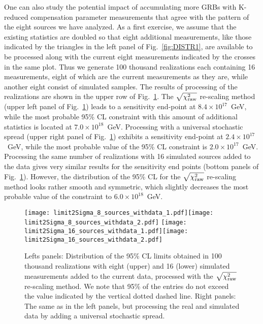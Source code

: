 \documentclass[12pt]{article}
\begin{document}
{One can also study the potential impact of accumulating more GRBs with
K-reduced compensation parameter measurements that agree
with the pattern of the eight sources we have analyzed. As a first exercise, we assume that the
existing statistics are doubled so that  eight additional measurements, like
those indicated by the triangles in the left panel of Fig.~\ref{fig:DISTR1}, are available to
be processed along with the current eight measurements indicated
by the crosses in the same plot. Thus we generate 100 thousand realizations each containing 16 measurements,
eight of which are the current measurements as they are, while another eight consist of simulated samples.
The results of processing of the realizations are shown in
the upper row of Fig.~\ref{fig:limitsDISTR3}. The $\sqrt{\chi_{\rm raw}^2}$ re-scaling method (upper left panel of  Fig.~\ref{fig:limitsDISTR3})
leads to a sensitivity end-point at  $8.4\times 10^{17}$~GeV,
while the most probable 95\% CL constraint with this amount of additional statistics is located at $7.0\times 10^{18}$~GeV.
Processing with a universal stochastic spread (upper right panel of  Fig.~\ref{fig:limitsDISTR3}) exhibits a sensitivity end-point
at $2.4\times 10^{17}$~GeV, while the most probable value of the 95\% CL constraint is $2.0\times 10^{17}$~GeV.
Processing the same number of realizations with 16 simulated sources added to the data gives very similar results for the sensitivity
end points (bottom panels of  Fig.~\ref{fig:limitsDISTR3}). However, the distribution of the 95\% CL for the $\sqrt{\chi_{\rm raw}^2}$ re-scaling method
looks rather smooth and symmetric, which slightly decreases the most probable value of the constraint to  $6.0\times 10^{18}$~GeV.

\begin{figure}
\centering
\texttt{[image: limit2Sigma\_8\_sources\_withdata\_1.pdf]}\hspace{0cm}\texttt{[image: limit2Sigma\_8\_sources\_withdata\_2.pdf]}
\texttt{[image: limit2Sigma\_16\_sources\_withdata\_1.pdf]}\hspace{0cm}\texttt{[image: limit2Sigma\_16\_sources\_withdata\_2.pdf]}
\vspace{-0.4cm}
\caption{Lefts panels: Distribution of the 95\% CL limits obtained in 100 thousand
realizations with eight (upper) and 16 (lower) simulated measurements added to
the current data, processed with the $\sqrt{\chi_{\rm raw}^2}$ re-scaling method.
We note that 95\% of the entries do not exceed the value indicated by the vertical dotted dashed line.
Right panels: The same as in the left panels, but processing the real and simulated data by adding a universal stochastic spread.}
\label{fig:limitsDISTR3}
\end{figure}

}
\end{document}

